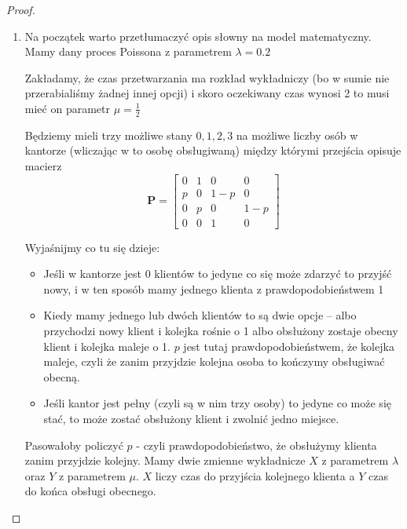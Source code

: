 \begin{proof} \( \)
    \begin{enumerate}
        \item 
        Na początek warto przetłumaczyć opis słowny na model matematyczny.
        Mamy dany proces Poissona z parametrem \( \lambda = 0.2 \)
        
        Zakładamy, że czas przetwarzania ma rozkład wykładniczy (bo w sumie nie przerabialiśmy żadnej innej opcji)
        i skoro oczekiwany czas wynosi 2 to musi mieć on parametr \( \mu = \frac{1}{2} \)
        
        
        Będziemy mieli trzy możliwe stany \( 0, 1, 2, 3 \) na możliwe liczby osób w kantorze (wliczając w to osobę obsługiwaną) między którymi przejścia
        opisuje macierz
        \[
            \mathbf{P} = \begin{bmatrix}
                0 & 1 & 0 & 0\\
                p & 0 & 1 - p & 0 \\
                0 & p & 0 & 1 - p \\
                0 & 0 & 1 & 0
            \end{bmatrix}
        \]
        
        Wyjaśnijmy co tu się dzieje:
        \begin{itemize}
            \item Jeśli w kantorze jest 0 klientów to jedyne co się 
            może zdarzyć to przyjść nowy, i w ten sposób mamy jednego klienta z prawdopodobieństwem 1
            
            \item Kiedy mamy jednego lub dwóch klientów to są dwie opcje -- albo przychodzi nowy klient i kolejka rośnie o 1 albo obsłużony zostaje obecny klient i kolejka maleje o 1.
            \( p \) jest tutaj prawdopodobieństwem, że kolejka maleje, czyli że zanim przyjdzie kolejna osoba to kończymy obsługiwać obecną.
            
            \item Jeśli kantor jest pełny (czyli są w nim trzy osoby) to jedyne co może się stać, to może zostać obsłużony klient i zwolnić jedno miejsce.
        \end{itemize}
        
        Pasowałoby policzyć \( p \) - czyli prawdopodobieństwo, że obsłużymy klienta zanim przyjdzie kolejny.
        Mamy dwie zmienne wykładnicze \( X \) z parametrem \(\lambda\) oraz \( Y \) z parametrem \( \mu \). \( X \) liczy czas do przyjścia kolejnego klienta a \( Y \) czas do końca obsługi obecnego.
        

\end{enumerate}
\end{proof}
